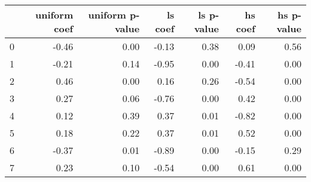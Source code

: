 \begin{tabular}{lrrrrrr}
\toprule
 & uniform coef & uniform p-value & ls coef & ls p-value & hs coef & hs p-value \\
\midrule
0 & -0.46 & 0.00 & -0.13 & 0.38 & 0.09 & 0.56 \\
1 & -0.21 & 0.14 & -0.95 & 0.00 & -0.41 & 0.00 \\
2 & 0.46 & 0.00 & 0.16 & 0.26 & -0.54 & 0.00 \\
3 & 0.27 & 0.06 & -0.76 & 0.00 & 0.42 & 0.00 \\
4 & 0.12 & 0.39 & 0.37 & 0.01 & -0.82 & 0.00 \\
5 & 0.18 & 0.22 & 0.37 & 0.01 & 0.52 & 0.00 \\
6 & -0.37 & 0.01 & -0.89 & 0.00 & -0.15 & 0.29 \\
7 & 0.23 & 0.10 & -0.54 & 0.00 & 0.61 & 0.00 \\
\bottomrule
\end{tabular}
